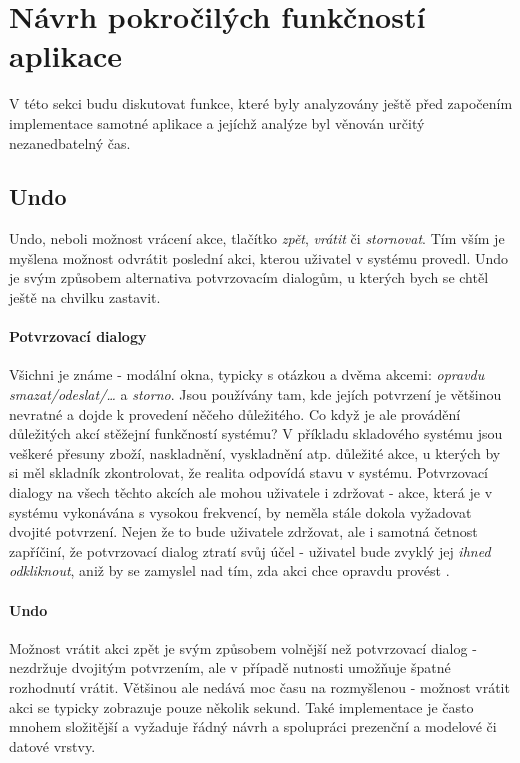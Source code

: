 \section{Návrh pokročilých funkčností aplikace}

V této sekci budu diskutovat funkce, které byly analyzovány ještě před započením implementace samotné aplikace a jejíchž analýze byl věnován určitý nezanedbatelný čas.


\subsection{Undo}\label{draft:undo}

Undo, neboli možnost vrácení akce, tlačítko \emph{zpět}, \emph{vrátit} či \emph{stornovat}. Tím vším je myšlena možnost odvrátit poslední akci, kterou uživatel v systému provedl. Undo je svým způsobem alternativa potvrzovacím dialogům, u kterých bych se chtěl ještě na chvilku zastavit.

\paragraph{Potvrzovací dialogy} Všichni je známe - modální okna, typicky s otázkou a dvěma akcemi: \emph{opravdu smazat/odeslat/\ldots} a \emph{storno}. Jsou používány tam, kde jejích potvrzení je většinou nevratné a dojde k provedení něčeho důležitého. Co když je ale provádění důležitých akcí stěžejní funkčností systému? V příkladu skladového systému jsou veškeré přesuny zboží, naskladnění, vyskladnění atp. důležité akce, u kterých by si měl skladník zkontrolovat, že realita odpovídá stavu v systému. Potvrzovací dialogy na všech těchto akcích ale mohou uživatele i zdržovat - akce, která je v systému vykonávána s vysokou frekvencí, by neměla stále dokola vyžadovat dvojité potvrzení. Nejen že to bude uživatele zdržovat, ale i samotná četnost zapříčiní, že potvrzovací dialog ztratí svůj účel - uživatel bude zvyklý jej \emph{ihned odkliknout}, aniž by se zamyslel nad tím, zda akci chce opravdu provést \cite{nn-dialogs}. 

\paragraph{Undo} Možnost vrátit akci zpět je svým způsobem volnější než potvrzovací dialog - nezdržuje dvojitým potvrzením, ale v případě nutnosti umožňuje špatné rozhodnutí vrátit. Většinou ale nedává moc času na rozmyšlenou - možnost vrátit akci se typicky zobrazuje pouze několik sekund. Také implementace je často mnohem složitější a vyžaduje řádný návrh a spolupráci prezenční a modelové či datové vrstvy.

